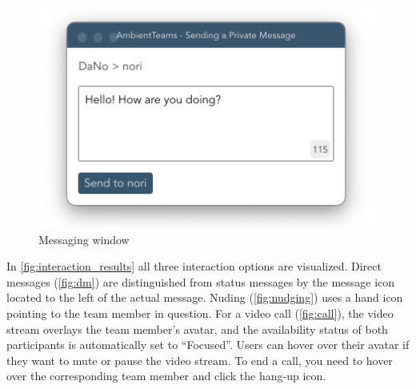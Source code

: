 \begin{figure}[h]
    \centering
    \includegraphics[width=.4\linewidth]{./images/messaging_window.png}
    \caption{Messaging window }
    \label{fig:messaging_window}
\end{figure}

In \autoref{fig:interaction_results} all three interaction options are visualized. Direct messages (\autoref{fig:dm}) are distinguished from status messages by the message icon located to the left of the actual message. Nuding (\autoref{fig:nudging}) uses a hand icon pointing to the team member in question. For a video call (\autoref{fig:call}), the video stream overlays the team member's avatar, and the availability status of both participants is automatically set to \enquote{Focused}. Users can hover over their avatar if they want to mute or pause the video stream. To end a call, you need to hover over the corresponding team member and click the hang-up icon.

